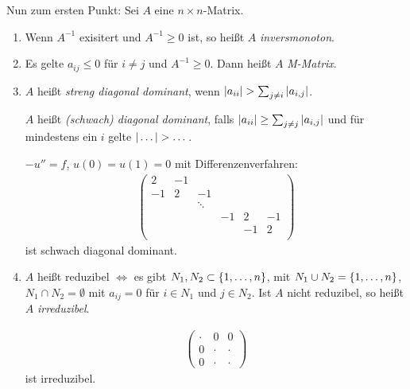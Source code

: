 Nun zum ersten Punkt: Sei $A$ eine $n \times n$-Matrix.
\begin{definition}
\renewcommand{\labelenumi}{(\roman{enumi})}
  \begin{enumerate}
  \item Wenn $A^{-1}$ exisitert und $A^{-1} \geq 0$ ist, so heißt $A$ \emph{inversmonoton}. 
\item Es gelte $a_{ij} \leq 0$ für $i \neq j$ und $A^{-1} \geq 0$. Dann heißt $A$ \emph{M-Matrix}.
\item $A$ heißt \emph{streng diagonal dominant}, wenn $\norm{a_{ii}}> \sum_{j \neq i} \norm {a_{i,j}}$.

$A$ heißt \emph{(schwach) diagonal dominant}, falls $|a_{ii}| \geq \sum_{j \neq j} |a_{i,j}|$ und für mindestens ein $i$ gelte $|\dots| > \dots$.

\begin{beispiel*}
  $-u'' = f$, $u(0) = u(1) = 0$ mit Differenzenverfahren:
  \begin{align*}
    \begin{pmatrix}
      2 &-1 & & & & \\ 
      -1 &2 &-1  & & & \\ 
       & & \ddots & & & \\ 
       & & &-1 &2 &-1 \\ 
       & & & &-1 &2 \\ 
    \end{pmatrix}
  \end{align*}
ist schwach diagonal dominant.
\end{beispiel*}

\item $A$ heißt reduzibel $\Leftrightarrow$  es gibt $N_1, N_2 \subset \left\{ 1, \dots, n \right\}$, mit $N_1 \cup N_2 = \left\{ 1, \dots, n \right\}$, $N_1 \cap N_2 = \emptyset$ mit $a_{ij} = 0$ für $i \in N_1$ und $j  \in N_2$. Ist $A$ nicht reduzibel, so heißt $A$ \emph{irreduzibel}.
  \begin{beispiel*}
    \begin{align*}
      \begin{pmatrix}
        \cdot & 0&0\\
0 &\cdot &\cdot\\
0 &\cdot &\cdot
      \end{pmatrix}
    \end{align*}
ist irreduzibel.
  \end{beispiel*}
  \end{enumerate}
\end{definition}
